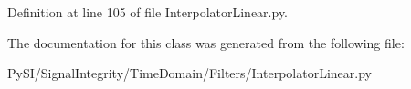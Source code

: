Definition at line 105 of file Interpolator\+Linear.\+py.



The documentation for this class was generated from the following file\+:\begin{DoxyCompactItemize}
\item 
Py\+S\+I/\+Signal\+Integrity/\+Time\+Domain/\+Filters/Interpolator\+Linear.\+py\end{DoxyCompactItemize}
